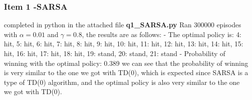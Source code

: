 \documentclass{article} %
\begin{document}
\subsubsection{Item 1 -\textbf{SARSA}}
completed in python in the attached file \textbf{q1\_SARSA.py}
\newline
    Ran 300000 episodes with $\alpha = 0.01$ and $\gamma = 0.8$, the results are as follows:
\newline \newline
    - The optimal policy is: {4: hit, 5: hit, 6: hit, 7: hit, 8: hit, 9: hit, 10: hit, 11: hit, 12: hit, 13: hit, 14: hit, 15: hit, 16: hit, 17: hit, 18: hit, 19: stand, 20: stand, 21: stand}
\newline
    - Probability of winning with the optimal policy: 0.389
\newline \newline
we can see that the probability of winning is very similar to the one we got with TD(0), which is expected since SARSA is a type of TD(0) algorithm, and the optimal policy is also very similar to the one we got with TD(0).
%
%
\end{document}
